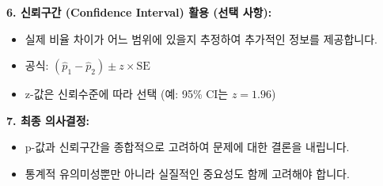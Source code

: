 \documentclass[11pt,a4paper]{article}
\theoremstyle{definition}
\begin{document}
\begin{summarybox}[title=\textbf{두 표본 비율 검정 핵심 요약}]
\textbf{6. 신뢰구간 (Confidence Interval) 활용 (선택 사항):}
\begin{itemize}
    \item 실제 비율 차이가 어느 범위에 있을지 추정하여 추가적인 정보를 제공합니다.
    \item 공식: $(\hat{p}_1 - \hat{p}_2) \pm z \times \text{SE}$
    \item z-값은 신뢰수준에 따라 선택 (예: 95\% CI는 $z=1.96$)
\end{itemize}

\textbf{7. 최종 의사결정:}
\begin{itemize}
    \item p-값과 신뢰구간을 종합적으로 고려하여 문제에 대한 결론을 내립니다.
    \item 통계적 유의미성뿐만 아니라 실질적인 중요성도 함께 고려해야 합니다.
\end{itemize}
\end{summarybox}
\end{document}
